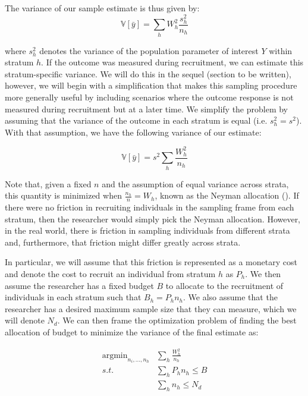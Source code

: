 \documentclass[a4paper,12pt]{article}
\theoremstyle{proposition}
\DeclareMathOperator*{\argmin}{argmin}
\begin{document}




The variance of our sample estimate is thus given by:
$$
\mathbb{V}[\bar{y}] =  \sum_{h}  W_h^2 \frac{s_h^2}{n_h}
$$


where $s_h^2$ denotes the variance of the population parameter of interest $Y$ within stratum $h$. If the outcome was measured during recruitment, we can estimate this stratum-specific variance. We will do this in the sequel (section to be written), however, we will begin with a simplification that makes this sampling procedure more generally useful by including scenarios where the outcome response is not measured during recruitment but at a later time. We simplify the problem by assuming that the variance of the outcome in each stratum is equal (i.e. $s_h^2 = s^2$). With that assumption, we have the following variance of our estimate:

$$
\mathbb{V}[\bar{y}] =  s^2  \sum_{h}  \frac{W_h^2}{n_h}
$$

Note that, given a fixed $n$ and the assumption of equal variance across strata, this quantity is minimized when $\frac{n_h}{n} = W_h$, known as the Neyman allocation (\cite{Neyman1934,Groves2010}). If there were no friction in recruiting individuals in the sampling frame from each stratum, then the researcher would simply pick the Neyman allocation. However, in the real world, there is friction in sampling individuals from different strata and, furthermore, that friction might differ greatly across strata.

In particular, we will assume that this friction is represented as a monetary cost and denote the cost to recruit an individual from stratum $h$ as $P_h$. We then assume the researcher has a fixed budget $B$ to allocate to the recruitment of individuals in each stratum such that $B_h = P_hn_h$. We also assume that the researcher has a desired maximum sample size that they can measure, which we will denote $N_d$. We can then frame the optimization problem of finding the best allocation of budget to minimize the variance of the final estimate as:


\begin{align*}
\argmin_{n_i,...,n_h}  &\sum_{h}  \frac{W_h^2}{n_h} \\
s.t. &\sum_h P_hn_h \leq B \\
     &\sum_h n_h \leq N_d
\end{align*}
\end{document}
